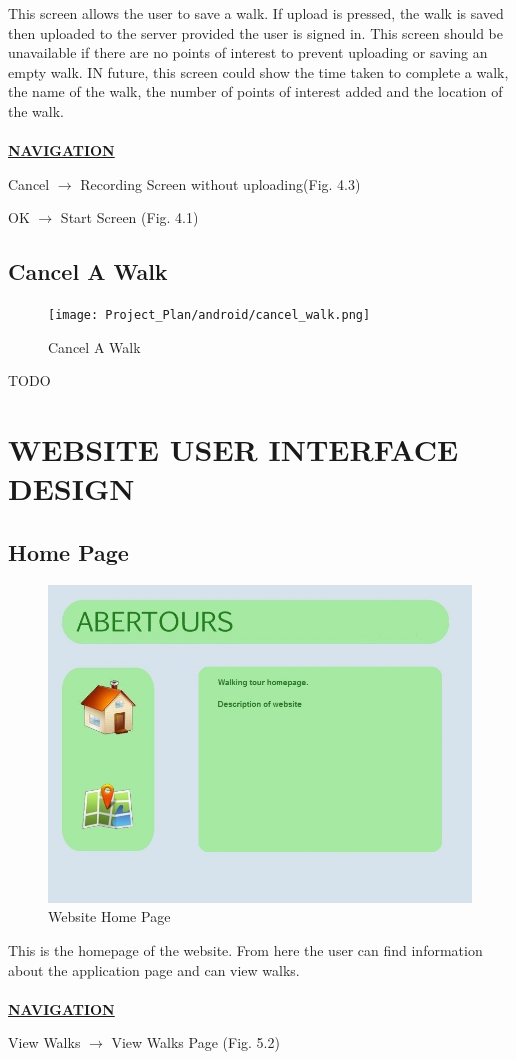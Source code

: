 \documentclass[12pt]{article}
\begin{document}
\par{This screen allows the user to save a walk. If upload is pressed, the walk is saved then uploaded to the server provided the user is signed in. This screen should be unavailable if there are no points of interest to prevent uploading or saving an empty walk. IN future, this screen could show the time taken to complete a walk, the name of the walk, the number of points of interest added and the location of the walk. \\ \\}
\textbf{\uline{NAVIGATION}}
\par{Cancel $\rightarrow$ Recording Screen without uploading(Fig. 4.3)}
\par{OK $\rightarrow$ Start Screen (Fig. 4.1)}
\subsection{Cancel A Walk}
\begin{figure}[htp]
\centering
\texttt{[image: Project\_Plan/android/cancel\_walk.png]}
\caption{Cancel A Walk}
\label{Cancel A Walk}
\end{figure}
TODO
\newpage
\section{WEBSITE USER INTERFACE DESIGN}
\subsection{Home Page}

\begin{figure}[htp]
\centering

\includegraphics[scale=0.60]{Project_Plan/Web/homepage_01.jpg}
\caption{Website Home Page}
\label{Website Home Page}
\end{figure}
\par{This is the homepage of the website. From here the user can find information about the application page and can view walks. \\ \\}
\textbf{\uline{NAVIGATION}}
\par{View Walks $\rightarrow$ View Walks Page (Fig. 5.2)}
\clearpage
\end{document}
